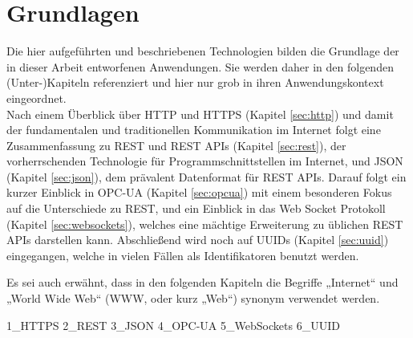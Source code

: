 \chapter{Grundlagen}
\label{cha:grundlagen}

Die hier aufgeführten und beschriebenen Technologien bilden die Grundlage der in dieser Arbeit entworfenen Anwendungen. Sie werden daher in den folgenden (Unter-)Kapiteln referenziert und hier nur grob in ihren Anwendungskontext eingeordnet.\\
Nach einem Überblick über HTTP und HTTPS (Kapitel \ref{sec:http}) und damit der fundamentalen und traditionellen Kommunikation im Internet folgt eine Zusammenfassung zu REST und REST APIs (Kapitel \ref{sec:rest}), der vorherrschenden Technologie für Programmschnittstellen im Internet, und JSON (Kapitel \ref{sec:json}), dem prävalent Datenformat für REST APIs. Darauf folgt ein kurzer Einblick in OPC-UA (Kapitel \ref{sec:opcua}) mit einem besonderen Fokus auf die Unterschiede zu REST, und ein Einblick in das Web Socket Protokoll (Kapitel \ref{sec:websockets}), welches eine mächtige Erweiterung zu üblichen REST APIs darstellen kann. Abschließend wird noch auf UUIDs (Kapitel \ref{sec:uuid}) eingegangen, welche in vielen Fällen als Identifikatoren benutzt werden.

Es sei auch erwähnt, dass in den folgenden Kapiteln die Begriffe „Internet“ und „World Wide Web“ (WWW, oder kurz „Web“) synonym verwendet werden.

{1_HTTPS}
{2_REST}
{3_JSON}
{4_OPC-UA}
{5_WebSockets}
{6_UUID}
